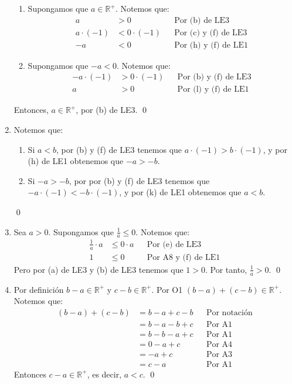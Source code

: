 \documentclass[11pt]{article}
\newcommand{\R}{\mathbb{R}}
\begin{document}
\begin{enumerate}[label=\alph*)]
\begin{enumerate}[label=\roman*)]
    \item Supongamos que $a \in \R^+$. Notemos que:
    \begin{align*}
        a &> 0 && \text{Por (b) de LE3}\\
        a \cdot (-1) &< 0 \cdot (-1) && \text{Por (c) y (f) de LE3}\\
        -a &< 0 && \text{Por (h) y (f) de LE1}
    \end{align*}
    \item Supongamos que $-a<0$. Notemos que:
    \begin{align*}
        -a \cdot (-1) &> 0 \cdot (-1) && \text{Por (b) y (f) de LE3}\\
        a &> 0 && \text{Por (l) y (f) de LE1}
    \end{align*}
    \end{enumerate} Entonces, $a \in \R^+$, por (b) de LE3. \qed
\item Notemos que:
    \begin{enumerate}[label=\roman*)]
        \item Si $a<b$, por (b) y (f) de LE3 tenemos que $a \cdot (-1) > b \cdot (-1)$, y por (h) de LE1 obtenemos que $-a > -b$.
        \item Si $-a > -b$, por por (b) y (f) de LE3 tenemos que $-a \cdot (-1) < -b \cdot (-1)$, y por (k) de LE1 obtenemos que $a<b$.
    \end{enumerate} \qed
\item Sea $a>0$. Supongamos que $\frac{1}{a} \leq 0$. Notemos que:
    \begin{align*}
        \frac{1}{a} \cdot a &\leq 0 \cdot a && \text{Por (e) de LE3}\\
        1 &\leq 0 && \text{Por A8 y (f) de LE1}
    \end{align*}
    Pero por (a) de LE3 y (b) de LE3 tenemos que $1>0$. Por tanto, $\frac{1}{a} > 0$. \qed
\item Por definición $b-a \in \R^+$ y $c-b \in \R^+$. Por O1 $(b-a) + (c-b) \in \R^+$. Notemos que:
    \begin{align*}
        (b-a) + (c-b) &= b - a + c -b && \text{Por notación}\\
        &= b-a -b+c && \text{Por A1}\\
        &= b-b -a+c && \text{Por A1}\\
        &= 0 - a +c && \text{Por A4}\\
        &= -a +c && \text{Por A3}\\
        &= c-a && \text{Por A1}
    \end{align*} Entonces $c-a \in \R^+$, es decir, $a<c$. \qed

\end{enumerate}
\end{document}
